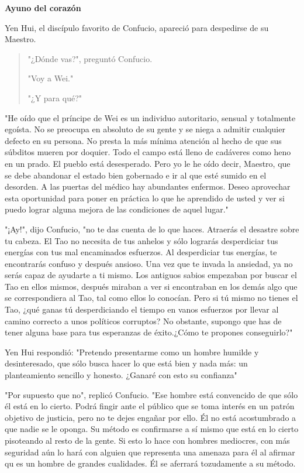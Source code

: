 \textbf{{Ayuno del corazón}}

Yen Hui, el discípulo favorito de Confucio, apareció para despedirse de
su Maestro.

\begin{quote}
"¿Dónde vas?", preguntó Confucio.

"Voy a Wei."

"¿Y para qué?"
\end{quote}

"He oído que el príncipe de Wei es un individuo autoritario, sensual y
totalmente egoísta. No se preocupa en absoluto de su gente y se niega a
admitir cualquier defecto en su persona. No presta la más mínima
atención al hecho de que sus súbditos mueren por doquier. Todo el campo
está lleno de cadáveres como heno en un prado. El pueblo está
desesperado. Pero yo le he oído decir, Maestro, que se debe abandonar el
estado bien gobernado e ir al que esté sumido en el desorden. A las
puertas del médico hay abundantes enfermos. Deseo aprovechar esta
oportunidad para poner en práctica lo que he aprendido de usted y ver si
puedo lograr alguna mejora de las condiciones de aquel lugar."

"¡Ay!", dijo Confucio, "no te das cuenta de lo que haces. Atraerás el
desastre sobre tu cabeza. El Tao no necesita de tus anhelos y sólo
lograrás desperdiciar tus energías con tus mal encaminados esfuerzos. Al
desperdiciar tus energías, te encontrarás confuso y después ansioso. Una
vez que te invada la ansiedad, ya no serás capaz de ayudarte a ti mismo.
Los antiguos sabios empezaban por buscar el Tao en ellos mismos, después
miraban a ver si encontraban en los demás algo que se correspondiera al
Tao, tal como ellos lo conocían. Pero si tú mismo no tienes el Tao, ¿qué
ganas tú desperdiciando el tiempo en vanos esfuerzos por llevar al
camino correcto a unos políticos corruptos? No obstante, supongo que has
de tener alguna base para tus esperanzas de éxito.¿Cómo te propones
conseguirlo?"

Yen Hui respondió: "Pretendo presentarme como un hombre humilde y
desinteresado, que sólo busca hacer lo que está bien y nada más: un
planteamiento sencillo y honesto. ¿Ganaré con esto su confianza"

"Por supuesto que no", replicó Confucio. "Ese hombre está convencido de
que sólo él está en lo cierto. Podrá fingir ante el público que se toma
interés en un patrón objetivo de justicia, pero no te dejes engañar por
ello. Él no está acostumbrado a que nadie se le oponga. Su método es
confirmarse a sí mismo que está en lo cierto pisoteando al resto de la
gente. Si esto lo hace con hombres mediocres, con más seguridad aún lo
hará con alguien que representa una amenaza para él al afirmar qu es un
hombre de grandes cualidades. Él se aferrará tozudamente a su método.

